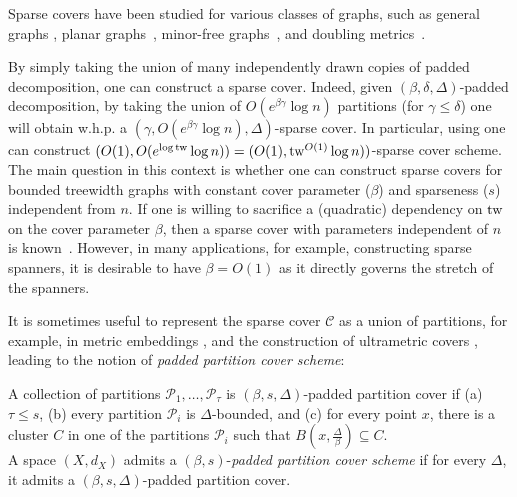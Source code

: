 \documentclass{article}
\makeatletter
\newcommand{\tw}{{\rm tw}}
\newcommand{\poly}{\mathrm{poly}}
\def\cC{\ensuremath{\mathcal{C}}}
\newcommand\IfRestateTF{%
  \ifx\label\thmt@gobble@label %
    \expandafter\@firstoftwo
  \else
    \expandafter\@secondoftwo
  \fi
}
\newcommand{\RestateRemark}{\IfRestateTF{{\normalfont\bfseries (Restated) }}{}}
\makeatother
\begin{document}
Sparse covers have been studied for various classes of graphs, such as general graphs \cite{AP90}, planar graphs~\cite{BLT14}, minor-free graphs~\cite{KLMN04,BLT14,AGMW10},  and doubling metrics~\cite{Fil19Approx}. 

By simply taking the union of many independently drawn copies of padded decomposition, one can construct a sparse cover. Indeed, given $(\beta,\delta,\Delta)$-padded decomposition, by taking the union of $O(e^{\beta\gamma}\log n)$ partitions (for $\gamma\le\delta$) one will obtain w.h.p. a $(\gamma,O(e^{\beta\gamma}\log n),\Delta)$-sparse cover. In particular, using  one can construct $(O(1),O(e^{\log\tw}\log n))=(O(1),\tw^{O(1)}\log n))$-sparse cover scheme. The main question in this context is whether one can construct sparse covers for bounded treewidth graphs with constant cover parameter ($\beta$) and sparseness ($s$) independent from $n$. If one is willing to sacrifice a (quadratic) dependency on $\tw$ on the cover parameter $\beta$, then a sparse cover with parameters independent of $n$ is known~\cite{KPR93,FT03,AGGM06}. However, in many applications, for example, constructing sparse spanners, it is desirable to have $\beta = O(1)$ as it directly governs the stretch of the spanners.





It is sometimes useful to represent the sparse cover $\cC$ as a union of partitions, for example, in 
metric embeddings \cite{KLMN04}, and the construction of ultrametric covers \cite{FL22,Fil23},
leading to the notion of \emph{padded partition cover scheme}:
\begin{definition}\label{def:PaddedPartitionCover} A collection of partitions $\mathcal{P}_{1},\dots,\mathcal{P}_{\tau}$
	is $(\beta,s,\Delta)$-padded partition cover if (a) $\tau\le s$, (b) every partition $\mathcal{P}_{i}$ is $\Delta$-bounded, and (c) for every point $x$, there is a cluster $C$ in one of the partitions $\mathcal{P}_{i}$ such that $B(x,\frac{\Delta}{\beta})\subseteq C$.\\
	A space $(X,d_{X})$ admits a $(\beta,s)$-\emph{padded partition cover scheme} if for every $\Delta$, it admits a  $(\beta,s,\Delta)$-padded  partition cover.
\end{definition}
\end{document}
